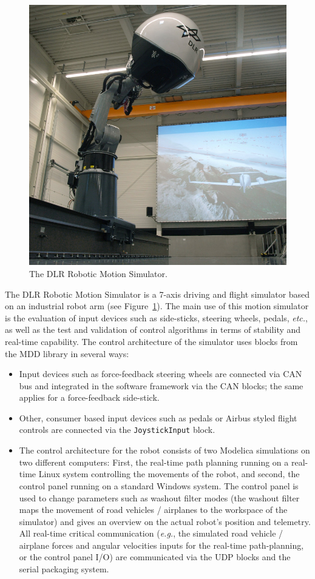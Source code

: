 \documentclass{resources/modelica}
\newcommand{\modelica}[1]{\lstinline[language=modelica]|#1|}
\begin{document}
\begin{figure}[htb]
  \centering
  \includegraphics[width=0.9\columnwidth]{figures/DLRRoboticMotionSimulator}
  \caption{The DLR Robotic Motion Simulator.}
  \label{fig:DLRRoboticMotionSimulator}
\end{figure}

The DLR Robotic Motion Simulator \citep{bellmann2011dlr} is a 7-axis driving and
flight simulator based on an industrial robot arm (see
Figure~\ref{fig:DLRRoboticMotionSimulator}). The main use of this motion
simulator is the evaluation of input devices such as side-sticks, steering
wheels, pedals, \textit{etc.}, as well as the test and validation of control algorithms
in terms of stability and real-time capability. The control architecture of the
simulator uses blocks from the MDD library in several ways:
\begin{itemize}
  \item Input devices such as force-feedback steering wheels are connected via CAN bus
and integrated in the software framework via the CAN blocks; the same
applies for a force-feedback side-stick.
  \item Other, consumer based input devices such as pedals or Airbus styled flight
controls are connected via the \modelica{JoystickInput} block.
  \item The control architecture for the robot consists of two Modelica simulations on
two different computers: First, the real-time path planning running on a
real-time Linux system controlling the movements of the robot, and second, the
control panel running on a standard Windows system. The control panel is used to
change parameters such as washout filter modes (the washout filter maps the
movement of road vehicles / airplanes to the workspace of the simulator) and
gives an overview on the actual robot's position and telemetry. All real-time critical
communication (\textit{e.g.}, the simulated road vehicle / airplane forces and
angular velocities inputs for the real-time path-planning, or the control panel
I/O) are communicated via the UDP blocks and the serial
packaging system.
\end{itemize}
\end{document}
